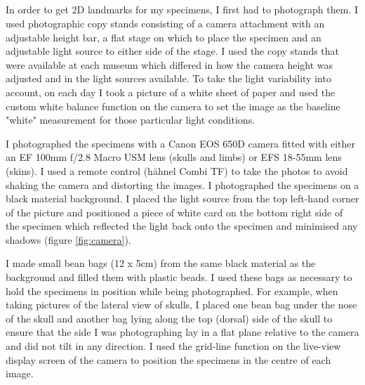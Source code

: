 \newpage
\subsection{}


	In order to get 2D landmarks for my specimens, I first had to photograph them. I used photographic copy stands consisting of a camera attachment with an adjustable height bar, a flat stage on which to place the specimen and an adjustable light source to either side of the stage. I used the copy stands that were available at each museum which differed in how the camera height was adjusted and in the light sources available.
	To take the light variability into account, on each day I took a picture of a white sheet of paper and used the custom white balance function on the camera to set the image as the baseline "white" measurement for those particular light conditions.
	
	I photographed the specimens with a Canon EOS 650D camera fitted with either an EF 100mm f/2.8 Macro USM lens (skulls and limbs) or EFS 18-55mm lens (skins). I used a remote control (h\"ahnel Combi TF) to take the photos to avoid shaking the camera and distorting the images. I photographed the specimens on a black material background. I placed the light source from the top left-hand corner of the picture and positioned a piece of white card on the bottom right side of the specimen which reflected the light back onto the specimen and minimised any shadows (figure \ref{fig:camera}).

	I made small bean bags (12 x 5cm) from the same black material as the background and filled them with plastic beads. I used these bags as necessary to hold the specimens in position while being photographed. For example, when taking pictures of the lateral view of skulls, I placed one bean bag under the nose of the skull and another bag lying along the top (dorsal) side of the skull to ensure that the side I was photographing lay in a flat plane relative to the camera and did not tilt in any direction. 
	I used the grid-line function on the live-view display screen of the camera to position the specimens in the centre of each image. 

